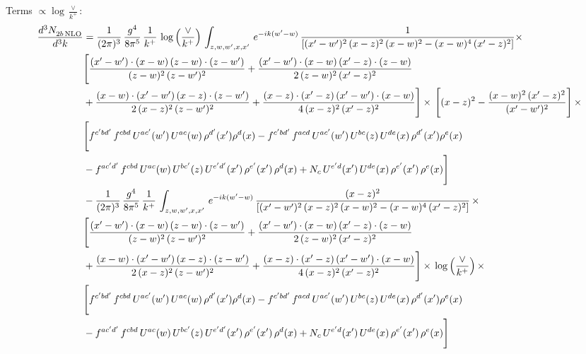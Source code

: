 \documentclass[10pt]{article}
\numberwithin{equation}{section}
\begin{document}
\noindent Terms $\propto\log\frac{\vee}{k^+}$:
\begin{align}
    \frac{d^{3}N_{2b\,\rm NLO}^{\rm}}{d^{3}k}  & =  \frac{1}{(2\pi)^{3}}\, \frac{g^{4}}{8\pi^{5}}\,\frac{1}{k^{+}}\,\log{\left(\frac{\vee}{k^{+}}\right)}\,\int_{z,w,w^{\prime},x,x'}\, e^{-ik(w^{\prime}-w)}\, \frac{1}{\left[(x'-w')^{2}\,(x-z)^{2}\,(x-w)^{2} - (x-w)^{4}\, (x'-z)^{2}\right]} \times\notag \\ & \Bigg[\frac{(x'-w')\cdot (x-w)\, (z-w)\cdot (z-w')}{(z-w)^{2}\, (z-w')^{2}}+\frac{(x'-w')\cdot (x-w)\, (x'-z)\cdot (z-w)}{2\, (z-w)^{2}\, (x'-z)^{2}}\notag \\ & +\frac{(x-w)\cdot (x'-w')\, (x-z)\cdot (z-w')}{2\, (x-z)^{2}\, (z-w')^{2}}+\frac{(x-z)\cdot (x'-z)\, (x'-w')\cdot (x-w)}{4\, (x-z)^{2}\, (x'-z)^{2}}\Bigg] \times\,\Bigg[(x-z)^{2} - \frac{(x-w)^{2}\, (x'-z)^{2}}{(x'-w')^{2}}\Bigg]\,\times \notag \\ & \Bigg[f^{c'bd'}\,f^{cbd}\, U^{ac'}(w')\,U^{ac}(w)\,\rho^{d'}(x')\rho^{d}(x)- f^{c'bd'}\,f^{acd}\,U^{ac'}(w')\,U^{bc}(z)\,U^{de}(x)\,\rho^{d'}(x')\rho^{e}(x) \notag \\ & -f^{ac'd'}\,f^{cbd}\,U^{ac}(w)\,U^{bc'}(z)\,U^{e'd'}(x')\,\rho^{e'}(x')\,\rho^{d}(x) +N_{c}\,U^{e'd}(x')\,U^{de}(x)\,\rho^{e'}(x')\,\rho^{e}(x)\Bigg] \notag \\
&  - \frac{1}{(2\pi)^{3}}\, \frac{g^{4}}{8\pi^{5}}\,\frac{1}{k^{+}}\,\int_{z,w,w^{\prime},x,x'}\, e^{-ik(w^{\prime}-w)}\, \frac{(x-z)^{2}}{\left[(x'-w')^{2}\,(x-z)^{2}\,(x-w)^{2} - (x-w)^{4}\, (x'-z)^{2}\right]}\,  \times\notag \\ & \Bigg[\frac{(x'-w')\cdot (x-w)\, (z-w)\cdot (z-w')}{(z-w)^{2}\, (z-w')^{2}}+\frac{(x'-w')\cdot (x-w)\, (x'-z)\cdot (z-w)}{2\, (z-w)^{2}\, (x'-z)^{2}}\notag \\ & +\frac{(x-w)\cdot (x'-w')\, (x-z)\cdot (z-w')}{2\, (x-z)^{2}\, (z-w')^{2}}+\frac{(x-z)\cdot (x'-z)\, (x'-w')\cdot (x-w)}{4\, (x-z)^{2}\, (x'-z)^{2}}\Bigg] \times\,\log{\left(\frac{\vee}{k^{+}}\right)}\,\times \notag \\ & \Bigg[f^{c'bd'}\,f^{cbd}\, U^{ac'}(w')\,U^{ac}(w)\,\rho^{d'}(x')\rho^{d}(x)- f^{c'bd'}\,f^{acd}\,U^{ac'}(w')\,U^{bc}(z)\,U^{de}(x)\,\rho^{d'}(x')\rho^{e}(x) \notag \\ & -f^{ac'd'}\,f^{cbd}\,U^{ac}(w)\,U^{bc'}(z)\,U^{e'd'}(x')\,\rho^{e'}(x')\,\rho^{d}(x) +N_{c}\,U^{e'd}(x')\,U^{de}(x)\,\rho^{e'}(x')\,\rho^{e}(x)\Bigg] \notag \\

\end{align}
\end{document}
